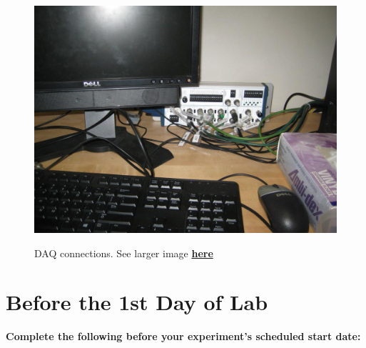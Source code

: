 \documentclass{../lab}
\begin{document}
\begin{figure}[h]
\begin{minipage}{0.32\textwidth}
\end{minipage}
\begin{minipage}{0.32\textwidth}
    \href{http://experimentationlab.berkeley.edu/sites/default/files/IMG\_4081.JPG}{\includegraphics[width=\linewidth,keepaspectratio]{images/IMG_4081.JPG}}
    \caption{DAQ connections. See larger image \href{http://experimentationlab.berkeley.edu/sites/default/files/IMG\_4081.JPG}{\textbf{here}}}
\end{minipage}
\end{figure}

\noindent

\section{Before the 1st Day of Lab}
\label{sec:BeforeFirstDay}

\textbf{Complete the following before your experiment's scheduled start date:}
\end{document}
